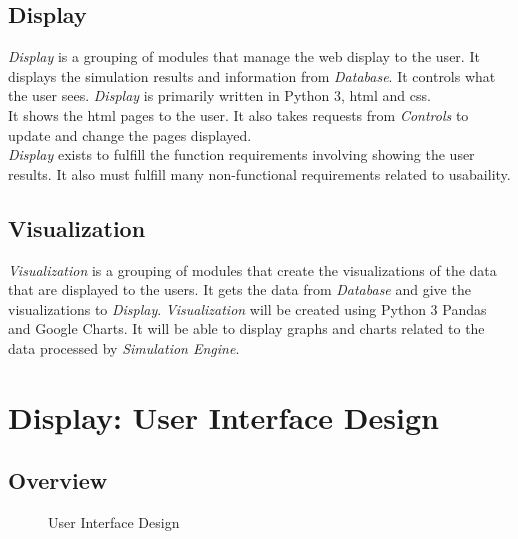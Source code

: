 \documentclass[12pt]{article}
\begin{document}
\subsection{Display}
\textit{Display} is a grouping of modules that manage the web display to the user. It displays the simulation results and information from \textit{Database}. It controls what the user sees. \textit{Display} is primarily written in Python 3, html and css. \\
It shows the html pages to the user. It also takes requests from \textit{Controls} to update and change the pages displayed. \\
\textit{Display} exists to fulfill the function requirements involving showing the user results. It also must fulfill many non-functional requirements related to usabaility. \\
\subsection{Visualization}
\textit{Visualization} is a grouping of modules that create
the visualizations of the data that are displayed to the users. 
It gets the data from \textit{Database} and give the visualizations to \textit{Display}. \textit{Visualization} will be created using Python 3 Pandas and Google Charts. It will be able to display graphs and charts related to the data processed by \textit{Simulation Engine}.

\section{Display: User Interface Design}
\subsection{Overview}


\begin{figure}[H]
	\centering
	\caption{User Interface Design}
\end{figure}
\end{document}
